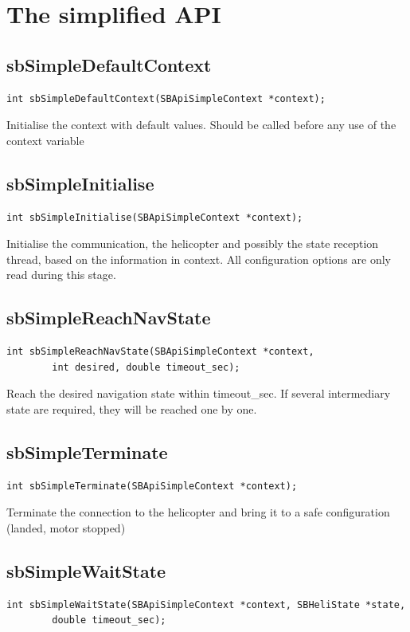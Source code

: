 \documentclass{article}
\begin{document}
\section{The simplified API}

\subsection{sbSimpleDefaultContext}
\label{sec:sbSimpleDefaultContext}
\begin{verbatim}
int sbSimpleDefaultContext(SBApiSimpleContext *context);
\end{verbatim}
Initialise the context with default values. Should be called before any 
use of the context variable 

\subsection{sbSimpleInitialise}
\label{sec:sbSimpleInitialise}
\begin{verbatim}
int sbSimpleInitialise(SBApiSimpleContext *context);
\end{verbatim}
Initialise the communication, the helicopter and possibly the 
state reception thread, based on the information in context.
All configuration options are only read during this stage.


\subsection{sbSimpleReachNavState}
\label{sec:sbSimpleReachNavState}
\begin{verbatim}
int sbSimpleReachNavState(SBApiSimpleContext *context, 
		int desired, double timeout_sec);
\end{verbatim}

Reach the desired navigation state within timeout\_sec. If several
intermediary state are required, they will be reached one by one.

\subsection{sbSimpleTerminate}
\label{sec:sbSimpleTerminate}
\begin{verbatim}
int sbSimpleTerminate(SBApiSimpleContext *context);
\end{verbatim}
Terminate the connection to the helicopter and bring it to a safe
configuration (landed, motor stopped)

\subsection{sbSimpleWaitState}
\label{sec:sbSimpleWaitState}
\begin{verbatim}
int sbSimpleWaitState(SBApiSimpleContext *context, SBHeliState *state, 
        double timeout_sec);
\end{verbatim}
\end{document}
